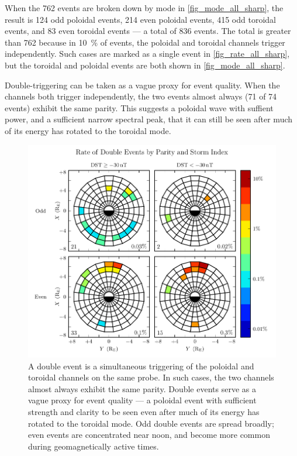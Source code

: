 
When the 762 events are broken down by mode in \cref{fig_mode_all_sharp}, the result is 124 odd poloidal events, 214 even poloidal events, 415 odd toroidal events, and 83 even toroidal events --- a total of 836 events. The total is greater than 762 because in \about\SI{10}{\percent} of events, the poloidal and toroidal channels trigger independently. Such cases are marked as a single event in \cref{fig_rate_all_sharp}, but the toroidal and poloidal events are both shown in \cref{fig_mode_all_sharp}. 

Double-triggering can be taken as a vague proxy for event quality. When the channels both trigger independently, the two events almost always (71 of 74 events) exhibit the same parity. This suggests a poloidal wave with suffient power, and a sufficient narrow spectral peak, that it can still be seen after much of its energy has rotated to the toroidal mode. 

\begin{figure}[!htb]
    \centering
    \includegraphics[width=\textwidth]{figures/double_rate_sharp.pdf}
    \caption[Rate of Double Pc4 Events by Parity and Storm Index]{
      A double event is a simultaneous triggering of the poloidal and toroidal channels on the same probe. In such cases, the two channels almost always exhibit the same parity. Double events serve as a vague proxy for event quality --- a poloidal event with sufficient strength and clarity to be seen even after much of its energy has rotated to the toroidal mode. Odd double events are spread broadly; even events are concentrated near noon, and become more common during geomagnetically active times. 
    }
    \label{fig_double_rate_sharp}
\end{figure}

